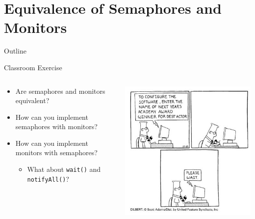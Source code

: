 \section{Equivalence of Semaphores and Monitors}

\begin{frame}{Outline}
  \tableofcontents[current]
\end{frame}

\begin{frame}{Classroom Exercise}
  \begin{columns}[c]
    \begin{column}{0.45\textwidth}
      \begin{itemize}
      \item Are semaphores and monitors equivalent?
      \item How can you implement semaphores with monitors?
      \item How can you implement monitors with semaphores?
        \begin{itemize}
        \item What about \lstinline!wait()! and \lstinline!notifyAll()!?
        \end{itemize}
      \end{itemize}
    \end{column}
    \begin{column}{0.55\textwidth}
      \begin{center}
        \includegraphics[width=\textwidth]{figures/dilbert-wait}
      \end{center}
    \end{column}
  \end{columns}
\end{frame}

